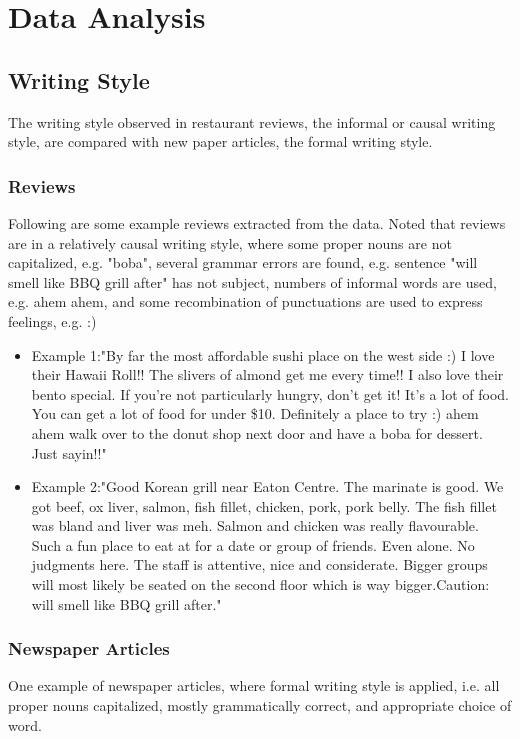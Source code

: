 \documentclass[sigconf]{acmart}
\begin{document}
\section{Data Analysis}

\subsection{Writing Style}

The writing style observed in restaurant reviews, the informal or causal writing style, are compared with new paper articles, the formal writing style. 

\subsubsection{Reviews} Following are some example reviews extracted from the data. Noted that reviews are in a relatively causal writing style, where some proper nouns are not capitalized, e.g. "boba", several grammar errors are found, e.g. sentence "will smell like BBQ grill after" has not subject, numbers of informal words are used, e.g. ahem ahem, and some recombination of punctuations are used to express feelings, e.g. :)

\begin{itemize}
\item{Example 1}:"By far the most affordable sushi place on the west side :) I love their Hawaii Roll!! The slivers of almond get me every time!! I also love their bento special. If you're not particularly hungry, don't get it! It's a lot of food.  You can get a lot of food for under \$10.  Definitely a place to try :) ahem ahem walk over to the donut shop next door and have a boba for dessert. Just sayin!!"
\item{Example 2}:"Good Korean grill near Eaton Centre. The marinate is good. We got beef, ox liver, salmon, fish fillet, chicken, pork, pork belly. The fish fillet was bland and liver was meh. Salmon and chicken was really flavourable. Such a fun place to eat at for a date or group of friends. Even alone. No judgments here. The staff is attentive, nice and considerate. Bigger groups will most likely be seated on the second floor which is way bigger.Caution: will smell like BBQ grill after."
\end{itemize}

\subsubsection{Newspaper Articles}
One example of newspaper articles, where formal writing style is applied, i.e. all proper nouns capitalized, mostly grammatically correct, and appropriate choice of word.
\end{document}
